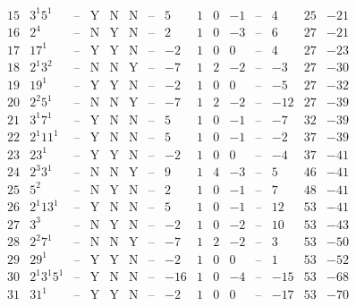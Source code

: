 \documentclass[11pt,reqno,a4letter]{article}
\numberwithin{figure}{section}
\numberwithin{table}{section}
\theoremstyle{plain}
\numberwithin{theorem}{section}
\theoremstyle{definition}
\begin{document}
\begin{table}[h!]
\begin{equation*}
{\begin{array}{|cc|c|ccc|c|c|ccc|c|ccc}
 15 & 3^1 5^1 & \text{--} & \text{Y} & \text{N} & \text{N} & \text{--} & 5 & 1 & 0 & -1 & \text{--} & 4 & 25 & -21 \\
 16 & 2^4 & \text{--} & \text{N} & \text{Y} & \text{N} & \text{--} & 2 & 1 & 0 & -3 & \text{--} & 6 & 27 & -21 \\
 17 & 17^1 & \text{--} & \text{Y} & \text{Y} & \text{N} & \text{--} & -2 & 1 & 0 & 0 & \text{--} & 4 & 27 & -23 \\
 18 & 2^1 3^2 & \text{--} & \text{N} & \text{N} & \text{Y} & \text{--} & -7 & 1 & 2 & -2 & \text{--} & -3 & 27 & -30 \\
 19 & 19^1 & \text{--} & \text{Y} & \text{Y} & \text{N} & \text{--} & -2 & 1 & 0 & 0 & \text{--} & -5 & 27 & -32 \\
 20 & 2^2 5^1 & \text{--} & \text{N} & \text{N} & \text{Y} & \text{--} & -7 & 1 & 2 & -2 & \text{--} & -12 & 27 & -39 \\
 21 & 3^1 7^1 & \text{--} & \text{Y} & \text{N} & \text{N} & \text{--} & 5 & 1 & 0 & -1 & \text{--} & -7 & 32 & -39 \\
 22 & 2^1 11^1 & \text{--} & \text{Y} & \text{N} & \text{N} & \text{--} & 5 & 1 & 0 & -1 & \text{--} & -2 & 37 & -39 \\
 23 & 23^1 & \text{--} & \text{Y} & \text{Y} & \text{N} & \text{--} & -2 & 1 & 0 & 0 & \text{--} & -4 & 37 & -41 \\
 24 & 2^3 3^1 & \text{--} & \text{N} & \text{N} & \text{Y} & \text{--} & 9 & 1 & 4 & -3 & \text{--} & 5 & 46 & -41 \\
 25 & 5^2 & \text{--} & \text{N} & \text{Y} & \text{N} & \text{--} & 2 & 1 & 0 & -1 & \text{--} & 7 & 48 & -41 \\
 26 & 2^1 13^1 & \text{--} & \text{Y} & \text{N} & \text{N} & \text{--} & 5 & 1 & 0 & -1 & \text{--} & 12 & 53 & -41 \\
 27 & 3^3 & \text{--} & \text{N} & \text{Y} & \text{N} & \text{--} & -2 & 1 & 0 & -2 & \text{--} & 10 & 53 & -43 \\
 28 & 2^2 7^1 & \text{--} & \text{N} & \text{N} & \text{Y} & \text{--} & -7 & 1 & 2 & -2 & \text{--} & 3 & 53 & -50 \\
 29 & 29^1 & \text{--} & \text{Y} & \text{Y} & \text{N} & \text{--} & -2 & 1 & 0 & 0 & \text{--} & 1 & 53 & -52 \\
 30 & 2^1 3^1 5^1 & \text{--} & \text{Y} & \text{N} & \text{N} & \text{--} & -16 & 1 & 0 & -4 & \text{--} & -15 & 53 & -68 \\
 31 & 31^1 & \text{--} & \text{Y} & \text{Y} & \text{N} & \text{--} & -2 & 1 & 0 & 0 & \text{--} & -17 & 53 & -70 \\

\end{array}}
\end{equation*}
\end{table}
\end{document}
